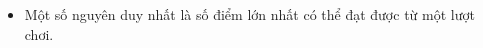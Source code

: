 \begin{itemize}
	\item Một số nguyên duy nhất là số điểm lớn nhất có thể đạt được từ một lượt chơi.
\end{itemize}

\